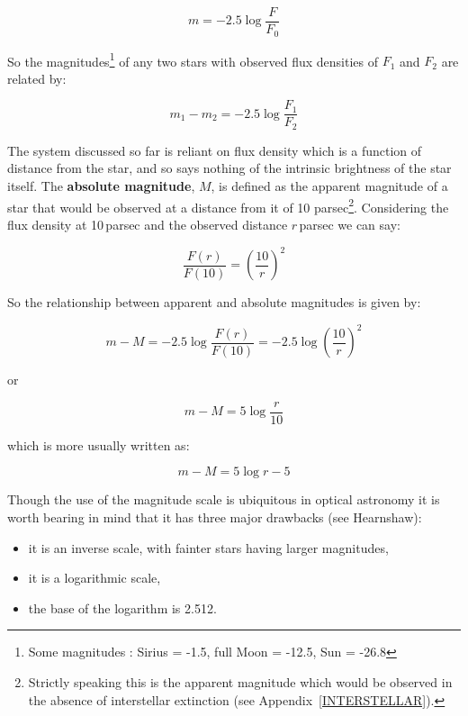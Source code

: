 \documentclass[twoside,11pt,nolof]{starlink}
\begin{document}
\begin{equation}
m= -2.5 \log \frac{F}{F_0}
\end{equation}

So the magnitudes\footnote{Some magnitudes : Sirius = -1.5, full Moon
= -12.5, Sun = -26.8} of any two stars with observed flux densities of
$F_1$ and $F_2$ are related by:

\begin{equation}
m_1 - m_2 = -2.5 \log \frac{F_1}{F_2}
\end{equation}

The system discussed so far is reliant on flux density which is a
function of distance from the star, and so says nothing of the
intrinsic brightness of the star itself. The \textbf{absolute magnitude},
$M$, is defined as the apparent magnitude of a star that would be
observed at a distance from it of 10 parsec\footnote{Strictly speaking
this is the apparent magnitude which would be observed in the absence
of interstellar extinction (see Appendix~\ref{INTERSTELLAR}).}. Considering
the flux density at 10\,parsec and the observed distance $r$\,parsec we
can say:

\begin{equation}
\frac{F(r)}{F(10)} = \left( \frac{10}{r} \right)^{2}
\end{equation}

So the relationship between apparent and absolute magnitudes is given
by:

\begin{equation}
m-M = -2.5 \log \frac{F(r)}{F(10)} = -2.5 \log \left( \frac{10}{r}
\right)^2
\end{equation}

or

\begin{equation}
m-M = 5 \log \frac{r}{10}
\end{equation}

which is more usually written as:

\begin{equation}
m-M = 5 \log r  - 5
\end{equation}

Though the use of the magnitude scale is ubiquitous in optical astronomy
it is worth bearing in mind that it has three major drawbacks (see
Hearnshaw\cite{HEARNSHAW91}):

\begin{itemize}

  \item it is an inverse scale, with fainter stars having larger
   magnitudes,

  \item it is a logarithmic scale,

  \item the base of the logarithm is 2.512.

\end{itemize}
\end{document}
